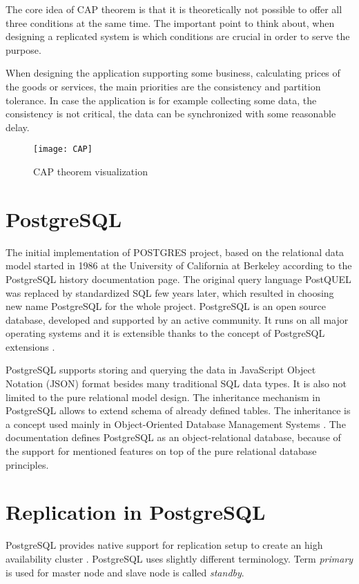 \documentclass[
  digital, %
  twoside, %
  table,   %
  lof,     %
  lot,     %
]{fithesis3}
\begin{document}
The core idea of CAP theorem is that it is theoretically not possible to offer all three conditions at the same time. The important point to think about, when designing a replicated system is which conditions are crucial in order to serve the purpose.

When designing the application supporting some business, calculating prices of the goods or services, the main priorities are the  consistency and partition tolerance. In case the application is for example collecting some data, the consistency is not critical, the data can be synchronized with some reasonable delay.
\begin{figure}[H]
\caption{CAP theorem visualization}
\centering
\texttt{[image: CAP]}
\label{fig:cap}
\end{figure}

\section{PostgreSQL} \label{sec:postgresql}
The initial implementation of POSTGRES project, based on the relational data model started in 1986 at the University of California at Berkeley according to the PostgreSQL history \cite{pg_history} documentation page. The original query language PostQUEL was replaced by standardized SQL few years later, which resulted in choosing new name PostgreSQL for the whole project. PostgreSQL is an open source database, developed and supported by an active community. It runs on all major operating systems and it is extensible thanks to the concept of PostgreSQL extensions \cite{pg_extensions}.

PostgreSQL supports storing and querying the data in JavaScript Object Notation (JSON) format besides many traditional SQL data types. It is also not limited to the pure relational model design. The inheritance mechanism in PostgreSQL \cite{inheritance} allows to extend schema of already defined tables. The inheritance is a concept used mainly in Object-Oriented Database Management Systems \cite{oodbms}. The documentation defines PostgreSQL as an object-relational database, because of the support for mentioned features on top of the pure relational database principles.

\section{Replication in PostgreSQL} \label{sec:pg_replication}
PostgreSQL provides native support for replication setup to create an high availability cluster \cite{pg_ha}. PostgreSQL uses slightly different terminology. Term \textit{primary} is used for master node and slave node is called \textit{standby}.
\end{document}
